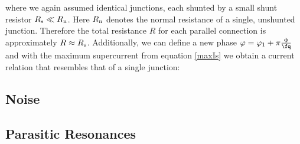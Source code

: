 
where we again assumed identical junctions, each shunted by a small shunt resistor $R_{\rm s}\ll R_{\rm n}$. Here $R_{\rm n}$ denotes the normal resistance of a single, unshunted junction. Therefore the total resistance $R$ for each parallel connection is approximately $R\approx R_{\rm s}$. Additionally, we can define a new phase $\varphi=\varphi_1 + \pi\frac{\Phi}{\unit{\fq}}$ and with the maximum supercurrent from equation \ref{maxIs} we obtain a current relation that resembles that of a single junction:


    

\subsection{Noise}

\subsection{Parasitic Resonances}



